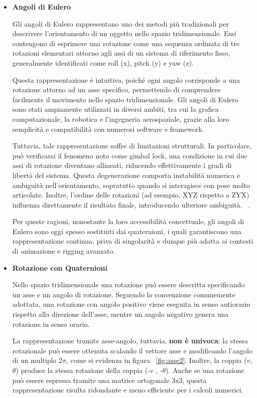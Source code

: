 \begin{itemize}
    \item \textbf {Angoli di Eulero}
    
    Gli angoli di Eulero rappresentano uno dei metodi più tradizionali per descrivere l'orientamento di un oggetto nello spazio tridimensionale. Essi contengono di esprimere una rotazione come una sequenza ordinata di tre rotazioni elementari attorno agli assi di un sistema di riferimento fisso, generalmente identificati come roll (x), pitch (y) e yaw (z).
    
    Questa rappresentazione è intuitiva, poiché ogni angolo corrisponde a una rotazione attorno ad un asse specifico, permettendo di comprendere facilmente il movimento nello spazio tridimensionale. Gli angoli di Eulero sono stati ampiamente utilizzati in diversi ambiti, tra cui la grafica computazionale, la robotica e l'ingegneria aerospaziale, grazie alla loro semplicità e compatibilità con numerosi software e framework.

    Tuttavia, tale rappresentazione soffre di limitazioni strutturali. In particolare, può verificarsi il fenomeno noto come gimbal lock, una condizione in cui due assi di rotazione diventano allineati, riducendo effettivamente i gradi di libertà del sistema. Questa degenerazione comporta instabilità numerica e ambiguità nell'orientamento, sopratutto quando si interagisce con pose molto articolate. Inoltre, l'ordine delle rotazioni (ad esempio, XYZ rispetto a ZYX) influenza direttamente il risultato finale, introducendo ulteriore ambiguità. ~\cite{quater}.

    Per queste ragioni, nonostante la loro accessibilità concettuale, gli angoli di Eulero sono oggi spesso sostituiti dai quaternioni, i quali garantiscono una rappresentazione continua, priva di singolarità e dunque più adatta ai contesti di animazione e rigging avanzato.

    \item \textbf{Rotazione con Quaternioni}
    
    Nello spazio tridimensionale una rotazione può essere descritta specificando un asse e un angolo di rotazione. Seguendo la convenzione comunemente adottata, una rotazione con angolo positivo viene eseguita in senso antiorario rispetto alla direzione dell'asse, mentre un angolo negativo genera una rotazione in senso orario.

    La rappresentazione tramite asse-angolo, tuttavia, \textbf{non è univoca}: la stessa rotazionale può essere ottenuta scalando il vettore asse e modificando l'angolo di un multiplo 2${\pi}$, come si evidenza in figura ~\ref{fig:asse2}. Inoltre, la coppia (${v}$, ${\theta}$) produce la stessa rotazione della coppia (-${v}$ , -${\theta}$).
    Anche se una rotazione può essere espressa tramite una matrice ortogonale 3x3, questa rappresentazione risulta ridondante e meno efficiente per i calcoli numerici.


\end{itemize}
